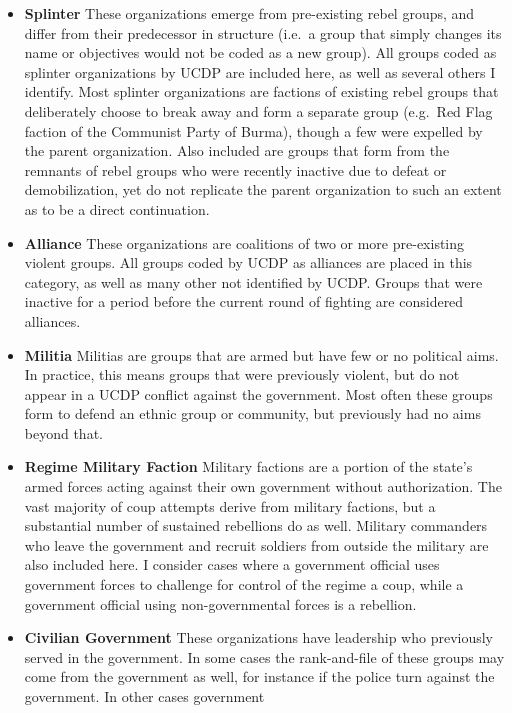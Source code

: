 \documentclass[12pt,]{book}
\theoremstyle{definition}
\theoremstyle{definition}
\theoremstyle{definition}
\theoremstyle{remark}
\begin{document}
\begin{itemize}
\item
  \textbf{Splinter} These organizations emerge from pre-existing rebel
  groups, and differ from their predecessor in structure (i.e.~a group
  that simply changes its name or objectives would not be coded as a new
  group). All groups coded as splinter organizations by UCDP are
  included here, as well as several others I identify. Most splinter
  organizations are factions of existing rebel groups that deliberately
  choose to break away and form a separate group (e.g.~Red Flag faction
  of the Communist Party of Burma), though a few were expelled by the
  parent organization. Also included are groups that form from the
  remnants of rebel groups who were recently inactive due to defeat or
  demobilization, yet do not replicate the parent organization to such
  an extent as to be a direct continuation.
\item
  \textbf{Alliance} These organizations are coalitions of two or more
  pre-existing violent groups. All groups coded by UCDP as alliances are
  placed in this category, as well as many other not identified by UCDP.
  Groups that were inactive for a period before the current round of
  fighting are considered alliances.
\item
  \textbf{Militia} Militias are groups that are armed but have few or no
  political aims. In practice, this means groups that were previously
  violent, but do not appear in a UCDP conflict against the government.
  Most often these groups form to defend an ethnic group or community,
  but previously had no aims beyond that.
\item
  \textbf{Regime Military Faction} Military factions are a portion of
  the state's armed forces acting against their own government without
  authorization. The vast majority of coup attempts derive from military
  factions, but a substantial number of sustained rebellions do as well.
  Military commanders who leave the government and recruit soldiers from
  outside the military are also included here. I consider cases where a
  government official uses government forces to challenge for control of
  the regime a coup, while a government official using non-governmental
  forces is a rebellion.
\item
  \textbf{Civilian Government} These organizations have leadership who
  previously served in the government. In some cases the rank-and-file
  of these groups may come from the government as well, for instance if
  the police turn against the government. In other cases government

\end{itemize}
\end{document}

